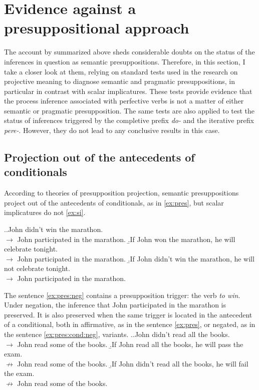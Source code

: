 \section{Evidence against a presuppositional approach}\label{sec:pragm:tests}
The account by \citet{Gronn:04, Gronn:06} summarized above sheds considerable doubts on the status of the inferences in question as semantic presuppositions. Therefore, in this section, I take a closer look at them, relying on standard tests used in the research on projective meaning to diagnose semantic and pragmatic presuppositions, in particular in contrast with scalar implicatures. These tests provide evidence that the process inference associated with perfective verbs is not a matter of either semantic or pragmatic presupposition. The same tests are also applied to test the status of inferences triggered by the completive prefix \textit{do-} and the iterative prefix \textit{pere-}. However, they do not lead to any conclusive results in this case.
\subsection{Projection out of the antecedents of conditionals}
According to theories of presupposition projection, semantic presuppositions project out of the antecedents of conditionals, as in \ref{ex:pres}, but scalar implicatures do not \ref{ex:si}.

\ex.\a.\label{ex:pres:neg}John didn't win the marathon.\\
$\rightarrow$ John participated in the marathon.
\b.\label{ex:pres}If John won the marathon, he will celebrate tonight.\\
$\rightarrow$ John participated in the marathon.
\b.\label{ex:pres:cond:neg}If John didn't win the marathon, he will not celebrate tonight.\\
$\rightarrow$ John participated in the marathon.

The sentence \ref{ex:pres:neg} contains a presupposition trigger: the verb \textit{to win}. Under negation, the inference that John participated in the marathon is preserved. It is also preserved when the same trigger is located in the antecedent of a conditional, both in affirmative, as in the sentence \ref{ex:pres}, or negated, as in the sentence \ref{ex:pres:cond:neg}, variants.
\ex.\a.\label{ex:si:neg}John didn't read all the books.\\
$\rightarrow$ John read some of the books.
\b.\label{ex:si}If John read all the books, he will pass the exam.\\
$\nrightarrow$ John read some of the books.
\b.\label{ex:si:cond:neg}If John didn't read all the books, he will fail the exam.\\
$\nrightarrow$ John read some of the books.

